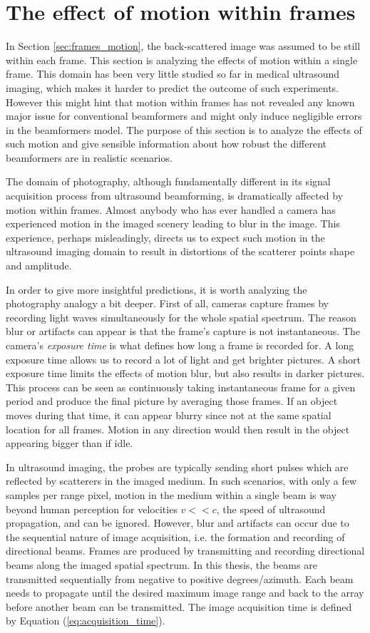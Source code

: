 \section{The effect of motion within frames}
\label{sec:beams_motion}
In Section \ref{sec:frames_motion}, the back-scattered image was assumed to be still within each frame. This section is analyzing the effects of motion within a single frame. This domain has been very little studied so far in medical ultrasound imaging, which makes it harder to predict the outcome of such experiments. However this might hint that motion within frames has not revealed any known major issue for conventional beamformers and might only induce negligible errors in the beamformers model. The purpose of this section is to analyze the effects of such motion and give sensible information about how robust the different beamformers are in realistic scenarios.

The domain of photography, although fundamentally different in its signal acquisition process from ultrasound beamforming, is dramatically affected by motion within frames. Almost anybody who has ever handled a camera has experienced motion in the imaged scenery leading to blur in the image. This experience, perhaps misleadingly, directs us to expect such motion in the ultrasound imaging domain to result in distortions of the scatterer points shape and amplitude.

In order to give more insightful predictions, it is worth analyzing the photography analogy a bit deeper. First of all, cameras capture frames by recording light waves simultaneously for the whole spatial spectrum. The reason blur or artifacts can appear is that the frame's capture is not instantaneous. The camera's \textit{exposure time} is what defines how long a frame is recorded for. A long exposure time allows us to record a lot of light and get brighter pictures. A short exposure time limits the effects of motion blur, but also results in darker pictures. This process can be seen as continuously taking instantaneous frame for a given period and produce the final picture by averaging those frames. If an object moves during that time, it can appear blurry since not at the same spatial location for all frames. Motion in any direction would then result in the object appearing bigger than if idle. 

In ultrasound imaging, the probes are typically sending short pulses which are reflected by scatterers in the imaged medium. In such scenarios, with only a few samples per range pixel, motion in the medium within a single beam is way beyond human perception for velocities $v << c$, the speed of ultrasound propagation, and can be ignored. However, blur and artifacts can occur due to the sequential nature of image acquisition, i.e. the formation and recording of directional beams. Frames are produced by transmitting and recording directional beams along the imaged spatial spectrum. In this thesis, the beams are transmitted sequentially from negative to positive degrees/azimuth. Each beam needs to propagate until the desired maximum image range and back to the array before another beam can be transmitted. The image acquisition time is defined by Equation (\ref{eq:acquisition_time}).

